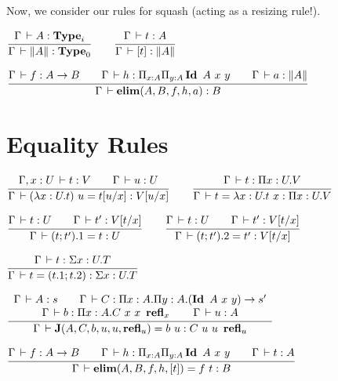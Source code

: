 \documentclass[a4paper,english]{lipics-utf8x}
\begin{document}
  \noindent %
  Now, we consider our rules for squash (acting as a resizing rule!).

  \begin{center}
  \(
    \ru{\Gamma \der A : \Type_i
      }{\Gamma \der \squash{A} : \Type_0}
    \qquad
    \ru{\Gamma \der t : A
      }{\Gamma \der [t] : \squash{A}}
  \)
  \end{center}

  \begin{center}
  \(
    \ru{\Gamma \der f : A \to B \qquad
        \Gamma \der h : \Pi_{x:A} \Pi_{y:A} \Id A\ x\ y \qquad
        \Gamma \der a : \squash{A}
      }{\Gamma \der \elim(A,B,f,h,a) : B}
  \)
  \end{center}

  \section{Equality Rules}


  \begin{center}
  \(
    \ru{\Gamma, x:U \der t:V \qquad
        \Gamma \der u : U
      }{\Gamma \der (\lambda x:U.t)~u = t[u/x] : V[u/x]}
    \qquad
    \ru{\Gamma \der t : \Pi x:U.V
      }{\Gamma \der t = \lambda x:U.t~x : \Pi x:U.V}
  \)
  \end{center}

  \begin{center}
  \(
    \ru{\Gamma \der t : U \qquad
        \Gamma \der t' : V[t/x]
      }{\Gamma \der (t;t').1 = t : U}
    \qquad
    \ru{\Gamma \der t : U \qquad
        \Gamma \der t' : V[t/x]
      }{\Gamma \der (t;t').2 = t' : V[t/x]}
  \)
  \end{center}

  \begin{center}
  \(
    \ru{\Gamma \der t : \Sigma x:U.T
      }{\Gamma \der t = (t.1 ; t.2) : \Sigma x:U.T}
  \)
  \end{center}

  \begin{center}
  \(
    \dru{\Gamma \der A : s \qquad
         \Gamma \der C : \Pi x:A. \Pi y:A. (\Id A\ x\ y) \to s'
       }{\Gamma \der b : \Pi x:A. C\ x\ x\ \refl_x \qquad
         \Gamma \der u : A
       }{\Gamma \der \J (A,C,b,u,u,\refl_u) = b\ u : C\ u\ u\ \refl_u}
  \)
  \end{center}

  \begin{center}
  \(
    \ru{\Gamma \der f : A \to B \qquad
        \Gamma \der h : \Pi_{x:A} \Pi_{y:A} \Id A\ x\ y \qquad
        \Gamma \der t : A
      }{\Gamma \der \elim(A,B,f,h,[t]) = f\ t : B}
  \)
  \end{center}
\end{document}
